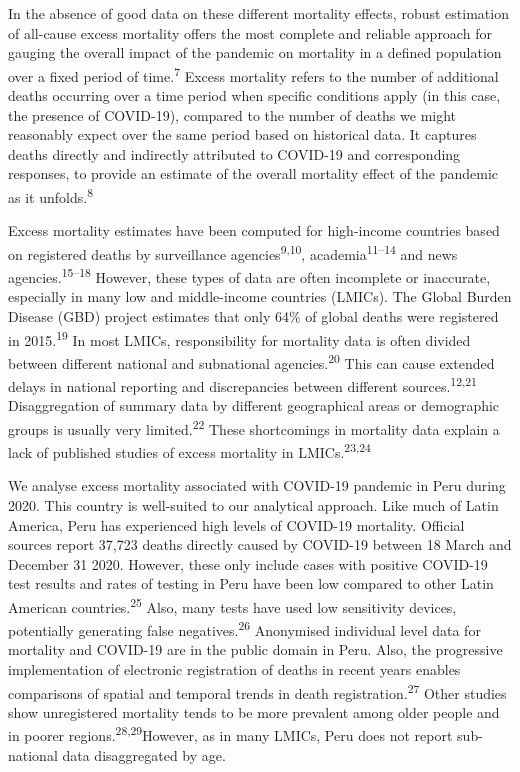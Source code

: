 \documentclass[
]{article}
\begin{document}
In the absence of good data on these different mortality effects, robust estimation of all-cause excess mortality offers the most complete and reliable approach for gauging the overall impact of the pandemic on mortality in a defined population over a fixed period of time.\textsuperscript{7} Excess mortality refers to the number of additional deaths occurring over a time period when specific conditions apply (in this case, the presence of COVID-19), compared to the number of deaths we might reasonably expect over the same period based on historical data. It captures deaths directly and indirectly attributed to COVID-19 and corresponding responses, to provide an estimate of the overall mortality effect of the pandemic as it unfolds.\textsuperscript{8}

Excess mortality estimates have been computed for high-income countries based on registered deaths by surveillance agencies\textsuperscript{9,10}, academia\textsuperscript{11--14} and news agencies.\textsuperscript{15--18} However, these types of data are often incomplete or inaccurate, especially in many low and middle-income countries (LMICs). The Global Burden Disease (GBD) project estimates that only 64\% of global deaths were registered in 2015.\textsuperscript{19} In most LMICs, responsibility for mortality data is often divided between different national and subnational agencies.\textsuperscript{20} This can cause extended delays in national reporting and discrepancies between different sources.\textsuperscript{12,21} Disaggregation of summary data by different geographical areas or demographic groups is usually very limited.\textsuperscript{22} These shortcomings in mortality data explain a lack of published studies of excess mortality in LMICs.\textsuperscript{23,24}

We analyse excess mortality associated with COVID-19 pandemic in Peru during 2020. This country is well-suited to our analytical approach. Like much of Latin America, Peru has experienced high levels of COVID-19 mortality. Official sources report 37,723 deaths directly caused by COVID-19 between 18 March and December 31 2020. However, these only include cases with positive COVID-19 test results and rates of testing in Peru have been low compared to other Latin American countries.\textsuperscript{25} Also, many tests have used low sensitivity devices, potentially generating false negatives.\textsuperscript{26} Anonymised individual level data for mortality and COVID-19 are in the public domain in Peru. Also, the progressive implementation of electronic registration of deaths in recent years enables comparisons of spatial and temporal trends in death registration.\textsuperscript{27} Other studies show unregistered mortality tends to be more prevalent among older people and in poorer regions.\textsuperscript{28,29}However, as in many LMICs, Peru does not report sub-national data disaggregated by age.
\end{document}
